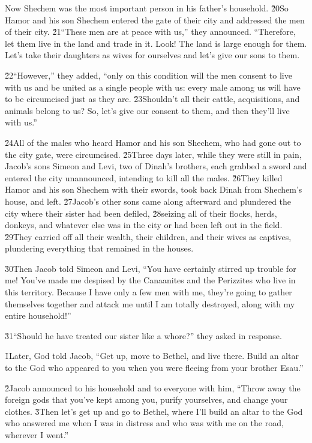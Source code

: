 Now Shechem was the most important person in his father's household. \v{20}So Hamor and his son Shechem entered the gate of their city and addressed the men of their city. \v{21}``These men are at peace with us,'' they announced. ``Therefore, let them live in the land and trade in it. Look! The land is large enough for them. Let's take their daughters as wives for ourselves and let's give our sons to them.

\v{22}``However,'' they added, ``only on this condition will the men consent to live with us and be united as a single people with us: every male among us will have to be circumcised just as they are. \v{23}Shouldn't all their cattle, acquisitions, and animals belong to us? So, let's give our consent to them, and then they'll live with us.''

\v{24}All of the males who heard Hamor and his son Shechem, who had gone out to the city gate, were circumcised. \v{25}Three days later, while they were still in pain, Jacob's sons Simeon and Levi, two of Dinah's brothers, each grabbed a sword and entered the city unannounced, intending to kill all the males. \v{26}They killed Hamor and his son Shechem with their swords, took back Dinah from Shechem's house, and left. \v{27}Jacob's other sons came along afterward and plundered the city where their sister had been defiled, \v{28}seizing all of their flocks, herds, donkeys, and whatever else was in the city or had been left out in the field. \v{29}They carried off all their wealth, their children, and their wives as captives, plundering everything that remained in the houses.

\v{30}Then Jacob told Simeon and Levi, ``You have certainly stirred up trouble for me! You've made me despised by the Canaanites and the Perizzites who live in this territory. Because I have only a few men with me, they're going to gather themselves together and attack me until I am totally destroyed, along with my entire household!''

\v{31}``Should he have treated our sister like a whore?'' they asked in response.

\v{1}Later, God told Jacob, ``Get up, move to Bethel, and live there. Build an altar to the God who appeared to you when you were fleeing from your brother Esau.''

\v{2}Jacob announced to his household and to everyone with him, ``Throw away the foreign gods that you've kept among you, purify yourselves, and change your clothes. \v{3}Then let's get up and go to Bethel, where I'll build an altar to the God who answered me when I was in distress and who was with me on the road, wherever I went.''

